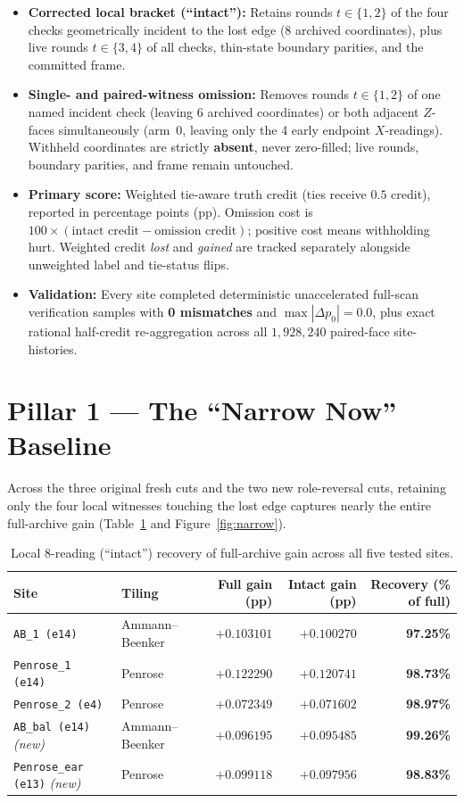 \documentclass[11pt,a4paper]{article}
\begin{document}
\begin{itemize}
    \item \textbf{Corrected local bracket (``intact''):} Retains rounds $t \in \{1, 2\}$ of the four checks geometrically incident to the lost edge (8 archived coordinates), plus live rounds $t \in \{3, 4\}$ of all checks, thin-state boundary parities, and the committed frame.
    \item \textbf{Single- and paired-witness omission:} Removes rounds $t \in \{1, 2\}$ of one named incident check (leaving 6 archived coordinates) or both adjacent $Z$-faces simultaneously (arm~$0$, leaving only the 4 early endpoint $X$-readings). Withheld coordinates are strictly \textbf{absent}, never zero-filled; live rounds, boundary parities, and frame remain untouched.
    \item \textbf{Primary score:} Weighted tie-aware truth credit (ties receive $0.5$ credit), reported in percentage points (pp). Omission cost is $100 \times (\text{intact credit} - \text{omission credit})$; positive cost means withholding hurt. Weighted credit \emph{lost} and \emph{gained} are tracked separately alongside unweighted label and tie-status flips.
    \item \textbf{Validation:} Every site completed deterministic unaccelerated full-scan verification samples with \textbf{0 mismatches} and $\max |\Delta p_0| = 0.0$, plus exact rational half-credit re-aggregation across all $1{,}928{,}240$ paired-face site-histories.
\end{itemize}

\section{Pillar 1 --- The ``Narrow Now'' Baseline}
Across the three original fresh cuts and the two new role-reversal cuts, retaining only the four local witnesses touching the lost edge captures nearly the entire full-archive gain (Table~\ref{tab:narrow} and Figure~\ref{fig:narrow}).

\begin{table}[h]
\centering
\caption{Local 8-reading (``intact'') recovery of full-archive gain across all five tested sites.}
\label{tab:narrow}
\begin{tabular}{llrrr}
\toprule
Site & Tiling & Full gain (pp) & Intact gain (pp) & Recovery (\% of full) \\
\midrule
\texttt{AB\_1 (e14)} & Ammann--Beenker & $+0.103101$ & $+0.100270$ & \textbf{97.25\%} \\
\texttt{Penrose\_1 (e14)} & Penrose & $+0.122290$ & $+0.120741$ & \textbf{98.73\%} \\
\texttt{Penrose\_2 (e4)} & Penrose & $+0.072349$ & $+0.071602$ & \textbf{98.97\%} \\
\texttt{AB\_bal (e14)} \textit{(new)} & Ammann--Beenker & $+0.096195$ & $+0.095485$ & \textbf{99.26\%} \\
\texttt{Penrose\_ear (e13)} \textit{(new)} & Penrose & $+0.099118$ & $+0.097956$ & \textbf{98.83\%} \\
\bottomrule
\end{tabular}
\end{table}
\end{document}
